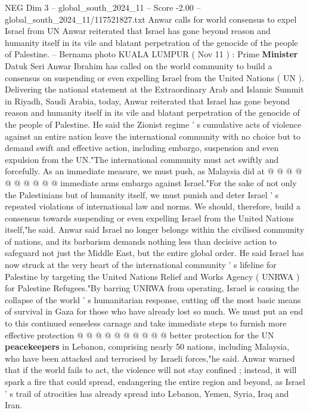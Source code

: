 \begin{textsample}{NEG Dim 3 – global\_south\_2024\_11 – Score -2.00 – global\_south\_2024\_11/117521827.txt}  \label{ex:f3_neg_131}
Anwar calls for world consensus to expel Israel from UN Anwar reiterated that Israel has gone beyond reason and humanity itself in its vile and blatant perpetration of the genocide of the people of Palestine. -- Bernama photo KUALA LUMPUR ( Nov 11 ) : Prime \textbf{Minister} Datuk Seri Anwar Ibrahim has called on the world community to build a consensus on suspending or even expelling Israel from the United Nations ( UN ).
Delivering the national statement at the Extraordinary Arab and Islamic Summit in Riyadh, Saudi Arabia, today, Anwar reiterated that Israel has gone beyond reason and humanity itself in its vile and blatant perpetration of the genocide of the people of Palestine.
He said the Zionist regime ' s cumulative acts of violence against an entire nation leave the international community with no choice but to demand swift and effective action, including embargo, suspension and even expulsion from the UN."The international community must act swiftly and forcefully.
As an immediate measure, we must push, as Malaysia did at @ @ @ @ @ @ @ @ @ @ immediate arms embargo against Israel."For the sake of not only the Palestinians but of humanity itself, we must punish and deter Israel ' s repeated violations of international law and norms.
We should, therefore, build a consensus towards suspending or even expelling Israel from the United Nations itself,"he said.
Anwar said Israel no longer belongs within the civilised community of nations, and its barbarism demands nothing less than decisive action to safeguard not just the Middle East, but the entire global order.
He said Israel has now struck at the very heart of the international community ' s lifeline for Palestine by targeting the United Nations Relief and Works Agency ( UNRWA ) for Palestine Refugees."By barring UNRWA from operating, Israel is causing the collapse of the world ' s humanitarian response, cutting off the most basic means of survival in Gaza for those who have already lost so much.
We must put an end to this continued senseless carnage and take immediate steps to furnish more effective protection @ @ @ @ @ @ @ @ @ @ better protection for the UN \textbf{peacekeepers} in Lebanon, comprising nearly 50 nations, including Malaysia, who have been attacked and terrorised by Israeli forces,"he said.
Anwar warned that if the world fails to act, the violence will not stay confined ; instead, it will spark a fire that could spread, endangering the entire region and beyond, as Israel ' s trail of atrocities has already spread into Lebanon, Yemen, Syria, Iraq and Iran.

\end{textsample}
